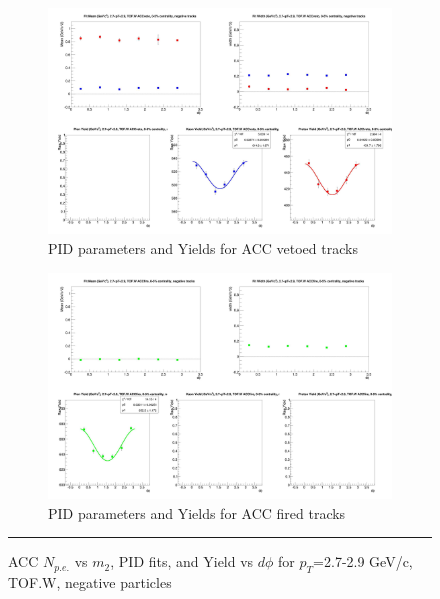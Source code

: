 \begin{figure}[H]
  \ContinuedFloat
    \begin{subfigure}{1\textwidth}
    \includegraphics[width=1\textwidth]{hiptfits/neg/fitParams_tof2_cent0_ch0_pT-27-29.jpg}
    \caption{PID parameters and Yields for ACC vetoed tracks}
    \end{subfigure}    
    \begin{subfigure}{1\textwidth}
    \includegraphics[width=1\textwidth]{hiptfits/neg/fitParams_tof3_cent0_ch0_pT-27-29.jpg}
    \caption{PID parameters and Yields for ACC fired tracks}
    \end{subfigure} 
    \rule{35em}{0.5pt}
  \caption[ACC $N_{p.e.}$ vs $m_2$, PID fits, and Yield vs $d\phi$ for $p_T$=2.7-2.9 GeV/c, TOF.W, negative particles]{ACC $N_{p.e.}$ vs $m_2$, PID fits, and Yield vs $d\phi$ for $p_T$=2.7-2.9 GeV/c, TOF.W, negative particles}
  \label{fig:acc27-29neg}
\end{figure}


